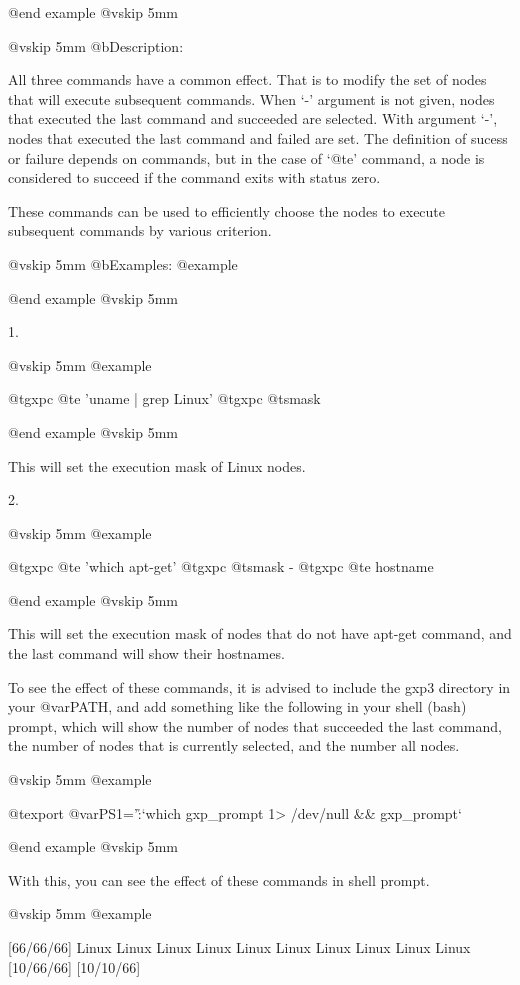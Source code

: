 @end example
@vskip 5mm

@vskip 5mm
@b{Description:}


  All three commands have a common effect. That is to modify the
set of nodes that will execute subsequent commands.  When `-'
argument is not given, nodes that executed the last command and
succeeded are selected. With argument `-', nodes that executed
the last command and failed are set. The definition of sucess or
failure depends on commands, but in the case of `@t{e}' command, a
node is considered to succeed if the command exits with status
zero.

These commands can be used to efficiently choose the nodes
to execute subsequent commands by various criterion.

@vskip 5mm
@b{Examples:}
@example


@end example
@vskip 5mm

1.

@vskip 5mm
@example

  @t{gxpc}  @t{e}  'uname | grep Linux'
  @t{gxpc}  @t{smask}

@end example
@vskip 5mm

This will set the execution mask of Linux nodes.

2.

@vskip 5mm
@example

  @t{gxpc}  @t{e}  'which apt-get'
  @t{gxpc}  @t{smask}  -
  @t{gxpc}  @t{e}  hostname

@end example
@vskip 5mm

This will set the execution mask of nodes that do not have apt-get
command, and the last command will show their hostnames.

To see the effect of these commands, it is advised to include the
gxp3 directory in your @var{PATH}, and add something like the following
in your shell (bash) prompt, which will show the number of nodes
that succeeded the last command, the number of nodes that is
currently selected, and the number all nodes.

@vskip 5mm
@example

  @t{export} @var{PS1}='\h:\W`which gxp_prompt 1> /dev/null && gxp_prompt`%

@end example
@vskip 5mm

With this, you can see the effect of these commands in shell
prompt.

@vskip 5mm
@example

  [66/66/66]%
  Linux
  Linux
  Linux
  Linux
  Linux
  Linux
  Linux
  Linux
  Linux
  Linux
  [10/66/66]%
  [10/10/66]%

